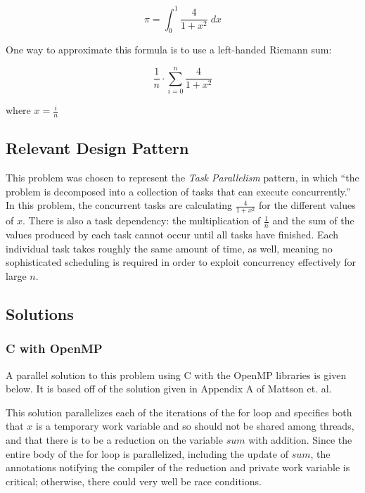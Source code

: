\[\pi = \int_0^1 \frac{4}{1 + x^2} \; dx\]

One way to approximate this formula is to use a left-handed Riemann sum:

\[\frac{1}{n} \cdot \sum_{i=0}^n \frac{4}{1 + x^2} \]

where $x = \frac{i}{n}$

\subsection{Relevant Design Pattern}
This problem was chosen to represent the \textit{Task Parallelism} pattern, 
in which ``the problem is decomposed into a collection of tasks that can execute concurrently.'' \cite{mass}
In this problem, the concurrent tasks are calculating $\frac{4}{1 + x^2}$ for the different values of $x$. 
There is also a task dependency: the multiplication of $\frac{1}{n}$ and the sum of the values produced by each task 
cannot occur until all tasks have finished. 
Each individual task takes roughly the same amount of time, as well, 
meaning no sophisticated scheduling is required in order to exploit concurrency effectively for large $n$.

\subsection{Solutions}
\subsubsection{C with OpenMP}
A parallel solution to this problem using C with the OpenMP libraries is given below. 
It is based off of the solution given in Appendix A of Mattson et. al. \cite{mass}

\begin{singlespacing}
\begin{small}

\end{small}
\end{singlespacing}

This solution parallelizes each of the iterations of the for loop 
and specifies both that $x$ is a temporary work variable and so should not be shared among threads, 
and that there is to be a reduction on the variable $sum$ with addition. 
Since the entire body of the for loop is parallelized, including the update of $sum$, 
the annotations notifying the compiler of the reduction and private work variable is critical; 
otherwise, there could very well be race conditions.


